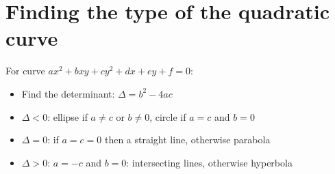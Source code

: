 \section{Finding the type of the quadratic curve}
For curve $ax^2+bxy+cy^2+dx+ey+f=0$:
\begin{itemize}
    \item Find the determinant: $\Delta = b^2-4ac$
    \item $\Delta < 0$: ellipse if $a\neq c$ or $b\neq 0$, circle if $a=c$ and $b=0$
    \item $\Delta = 0$: if $a=c=0$ then a straight line, otherwise parabola
    \item $\Delta > 0$: $a=-c$ and $b=0$: intersecting lines, otherwise hyperbola
\end{itemize}